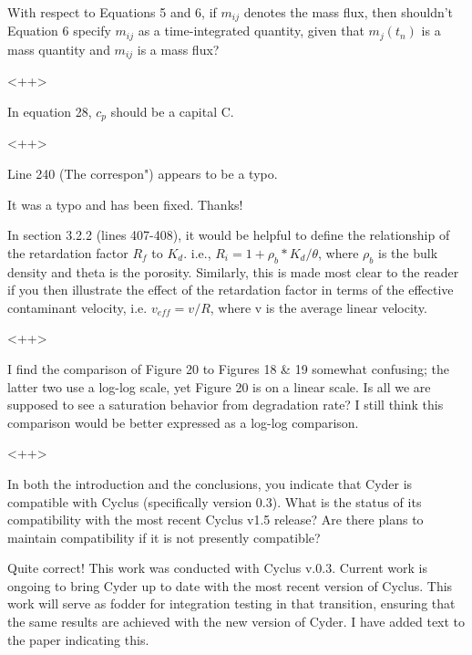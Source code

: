 \documentclass[answers,12pt]{exam}
\begin{document}
\begin{questions}
\question With respect to Equations 5 and 6, if $m_{ij}$ denotes the mass flux, 
then shouldn't Equation 6 specify $m_{ij}$ as a time-integrated quantity, given 
that $m_j(t_n)$ is a mass quantity and $m_{ij}$ is a mass flux?
\begin{solution}
<++>
\end{solution}

\question In equation 28, $c_p$ should be a capital C.
\begin{solution}
<++>
\end{solution}

\question Line 240 (The correspon") appears to be a typo.
\begin{solution}
It was a typo and has been fixed. Thanks!
\end{solution}

\question In section 3.2.2 (lines 407-408), it would be helpful to define the relationship of the retardation factor $R_f$ to $K_d$. i.e., $R_i = 1 + \rho_b 
* K_d / \theta$, where $\rho_b$ is the bulk density and theta is the porosity.  Similarly, this is made most clear to the reader if you then illustrate the effect of the retardation factor in terms of the effective contaminant velocity, i.e. $v_{eff} = v/R$, where v is the average linear velocity.
\begin{solution}
<++>
\end{solution}

\question I find the comparison of Figure 20 to Figures 18 \& 19 somewhat confusing; the latter two use a log-log scale, yet Figure 20 is on a linear scale. Is all we are supposed to see a saturation behavior from degradation rate? I still think this comparison would be better expressed as a log-log comparison.
\begin{solution}
<++>
\end{solution}

\question In both the introduction and the conclusions, you indicate that Cyder is compatible with Cyclus (specifically version 0.3). What is the status of its compatibility with the most recent Cyclus v1.5 release? Are there plans to maintain compatibility if it is not presently compatible?
\begin{solution}
Quite correct! This work was conducted with Cyclus v.0.3. Current work is ongoing to 
bring Cyder up to date with the most recent version of Cyclus. This work will 
serve as fodder for integration testing in that transition, ensuring that the 
same results are achieved with the new version of Cyder. I have added text to 
the paper indicating this.
\end{solution}


\end{questions}
\end{document}
